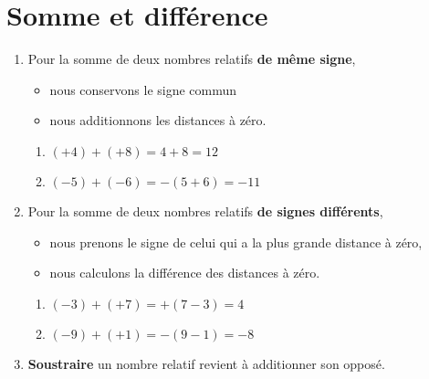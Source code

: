 


\section{Somme et différence}

\begin{propriete}
    \begin{enumerate}
        \item
    Pour la somme de deux nombres relatifs {\bf de même signe},
    \begin{itemize}
        \item
            nous conservons le signe commun
        \item
            nous additionnons les distances à zéro.
    \end{itemize}

    \begin{example}
        \begin{enumerate}
            \item
        \( (+4)+(+8)=4+8=12\)
    \item
        \( (-5)+(-6)=-(5+6)=-11\)
        \end{enumerate}
    \end{example}
\item
    Pour la somme de deux nombres relatifs {\bf de signes différents},
    \begin{itemize}
        \item
            nous prenons le signe de celui qui a la plus grande distance à zéro,
        \item
            nous calculons la différence des distances à zéro.
    \end{itemize}

    \begin{example}
        \begin{enumerate}
            \item
                \( (-3)+(+7)=+(7-3)=4\)
            \item
                \( (-9)+(+1)=-(9-1)=-8\)
        \end{enumerate}
    \end{example}
\item
    {\bf Soustraire} un nombre relatif revient à additionner son opposé.


\end{enumerate}
\end{propriete}
